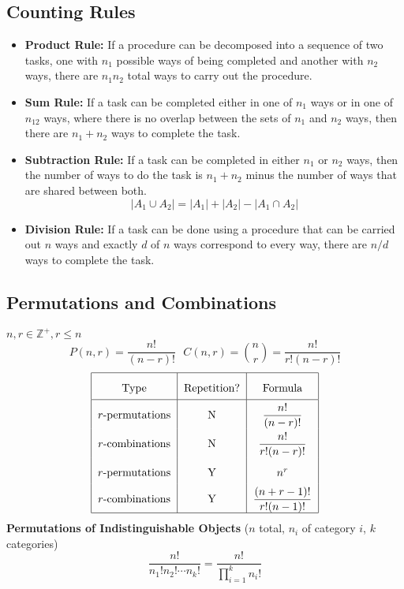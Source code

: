 \documentclass[12pt, A4, twocolumn]{article}
\newcommand{\Z}{\mathbb{Z}}
\begin{document}
		\subsection*{Counting Rules}
			\begin{itemize}
				\item
					\textbf{Product Rule:} If a procedure can be decomposed into a sequence of two tasks, one with \(n_1\) possible ways of being completed and another with \(n_2\) ways, there are \(n_1n_2\) total ways to carry out the procedure.
				\item
					\textbf{Sum Rule:} If a task can be completed either in one of \(n_1\) ways or in one of \(n_12\) ways, where there is no overlap between the sets of \(n_1\) and \(n_2\) ways, then there are \(n_1 + n_2\) ways to complete the task.
				\item
					\textbf{Subtraction Rule:} If a task can be completed in either \(n_1\) or \(n_2\) ways, then the number of ways to do the task is \(n_1 + n_2\) minus the number of ways that are shared between both.
						\[|A_1 \cup A_2| = |A_1| + |A_2| - |A_1 \cap A_2|\]
				\item
					\textbf{Division Rule:} If a task can be done using a procedure that can be carried out \(n\) ways and exactly \(d\) of \(n\) ways correspond to every way, there are \(n/d\) ways to complete the task.
			\end{itemize}
		\subsection*{Permutations and Combinations}
			\(n, r \in \Z^+, r \le n\)
			\[P(n, r) = \frac{n!}{(n - r)!} \,\,\,\, C(n, r) = \binom{n}{r} = \frac{n!}{r!(n - r)!}\]
			\[\def\arraystretch{2}\begin{tabular}{|c|c|c|}\hline
				Type & Repetition? & Formula \\\hline
				\(r\)-permutations & N & \(\dfrac{n!}{(n - r)!}\) \\
				\(r\)-combinations & N & \(\dfrac{n!}{r!(n - r)!}\) \\
				\(r\)-permutations & Y & \(n^r\) \\
				\(r\)-combinations & Y & \(\dfrac{(n + r - 1)!}{r!(n - 1)!}\) \\\hline
			\end{tabular}\]
			\textbf{Permutations of Indistinguishable Objects}
				(\(n\) total, \(n_i\) of category \(i\), \(k\) categories)
				\[\frac{n!}{n_1!n_2!\cdots n_k!} = \frac{n!}{\prod\limits_{i = 1}^k n_i!}\]
\end{document}
